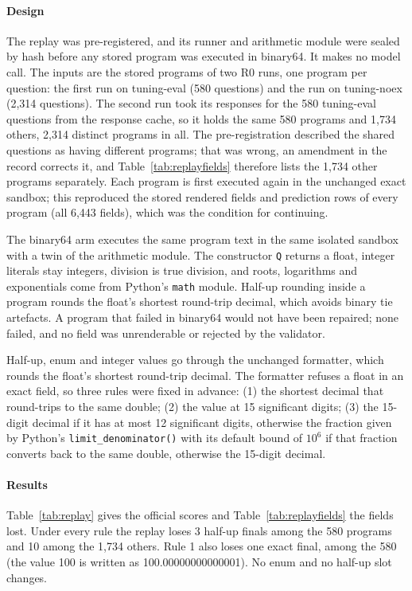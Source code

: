 \documentclass[conference]{IEEEtran}
\newcommand{\id}[1]{\texttt{#1}}
\begin{document}
\paragraph*{Design} The replay was pre-registered, and its runner and arithmetic module were sealed by hash before any stored program was executed in binary64. It makes no model call. The inputs are the stored programs of two R0 runs, one program per question: the first run on tuning-eval (580 questions) and the run on tuning-noex (2,314 questions). The second run took its responses for the 580 tuning-eval questions from the response cache, so it holds the same 580 programs and 1,734 others, 2,314 distinct programs in all. The pre-registration described the shared questions as having different programs; that was wrong, an amendment in the record corrects it, and Table~\ref{tab:replayfields} therefore lists the 1,734 other programs separately. Each program is first executed again in the unchanged exact sandbox; this reproduced the stored rendered fields and prediction rows of every program (all 6,443 fields), which was the condition for continuing.

The binary64 arm executes the same program text in the same isolated sandbox with a twin of the arithmetic module. The constructor \id{Q} returns a float, integer literals stay integers, division is true division, and roots, logarithms and exponentials come from Python's \id{math} module. Half-up rounding inside a program rounds the float's shortest round-trip decimal, which avoids binary tie artefacts. A program that failed in binary64 would not have been repaired; none failed, and no field was unrenderable or rejected by the validator.

Half-up, enum and integer values go through the unchanged formatter, which rounds the float's shortest round-trip decimal. The formatter refuses a float in an exact field, so three rules were fixed in advance: (1) the shortest decimal that round-trips to the same double; (2) the value at 15 significant digits; (3) the 15-digit decimal if it has at most 12 significant digits, otherwise the fraction given by Python's \id{limit\_denominator()} with its default bound of $10^6$ if that fraction converts back to the same double, otherwise the 15-digit decimal.

\paragraph*{Results} Table~\ref{tab:replay} gives the official scores and Table~\ref{tab:replayfields} the fields lost. Under every rule the replay loses 3 half-up finals among the 580 programs and 10 among the 1,734 others. Rule 1 also loses one exact final, among the 580 (the value 100 is written as 100.00000000000001). No enum and no half-up slot changes.
\end{document}
